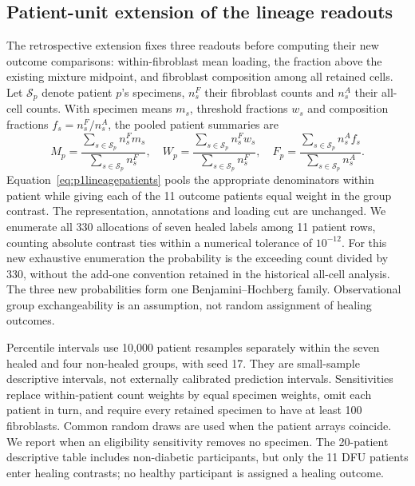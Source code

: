 \documentclass[10pt,a4paper]{article}
\begin{document}
\subsection{Patient-unit extension of the lineage readouts}
The retrospective extension fixes three readouts before computing their new outcome comparisons: within-fibroblast mean loading, the fraction above the existing mixture midpoint, and fibroblast composition among all retained cells. Let $\mathcal S_p$ denote patient $p$'s specimens, $n_s^F$ their fibroblast counts and $n_s^A$ their all-cell counts. With specimen means $m_s$, threshold fractions $w_s$ and composition fractions $f_s=n_s^F/n_s^A$, the pooled patient summaries are
\begin{equation}
M_p=\frac{\sum_{s\in\mathcal S_p}n_s^F m_s}{\sum_{s\in\mathcal S_p}n_s^F},\quad
W_p=\frac{\sum_{s\in\mathcal S_p}n_s^F w_s}{\sum_{s\in\mathcal S_p}n_s^F},\quad
F_p=\frac{\sum_{s\in\mathcal S_p}n_s^A f_s}{\sum_{s\in\mathcal S_p}n_s^A}.\label{eq:p1lineagepatients}
\end{equation}
Equation~\eqref{eq:p1lineagepatients} pools the appropriate denominators within patient while giving each of the 11 outcome patients equal weight in the group contrast. The representation, annotations and loading cut are unchanged. We enumerate all 330 allocations of seven healed labels among 11 patient rows, counting absolute contrast ties within a numerical tolerance of $10^{-12}$. For this new exhaustive enumeration the probability is the exceeding count divided by 330, without the add-one convention retained in the historical all-cell analysis. The three new probabilities form one Benjamini--Hochberg family. Observational group exchangeability is an assumption, not random assignment of healing outcomes.

Percentile intervals use 10,000 patient resamples separately within the seven healed and four non-healed groups, with seed 17. They are small-sample descriptive intervals, not externally calibrated prediction intervals. Sensitivities replace within-patient count weights by equal specimen weights, omit each patient in turn, and require every retained specimen to have at least 100 fibroblasts. Common random draws are used when the patient arrays coincide. We report when an eligibility sensitivity removes no specimen. The 20-patient descriptive table includes non-diabetic participants, but only the 11 DFU patients enter healing contrasts; no healthy participant is assigned a healing outcome.
\end{document}

